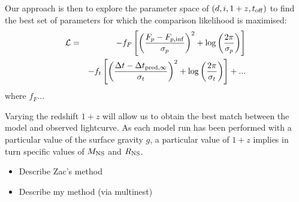 \documentclass{aastex61}
\begin{document}
Our approach is then to explore the parameter space of $(d, i, 1+z, t_{\rm off})$ to find the best set of parameters for which the comparison likelihood is maximised:
\begin{eqnarray}
\mathcal{L} & = & -f_F\left[\left( \frac{F_p-F_{p,\rm{inf}}}{\sigma_{p}}\right)^2 
    + \log\left(\frac{2\pi}{\sigma_p}\right)\right] \\
 & & -f_t\left[ \left( \frac{\Delta t-\Delta t_{{\rm pred},\infty}}{\sigma_t}\right)^2
    + \log\left(\frac{2\pi}{\sigma_t}\right)\right] + ...\\
\end{eqnarray}
where $f_F$...

Varying the redshift $1+z$ will allow us to obtain the best match between the model and observed lightcurve.
As each model run has been performed with a particular value of the surface gravity $g$, a particular value of $1+z$ implies in turn specific values of $M_{\rm NS}$ and $R_{\rm NS}$. 

\begin{itemize}
\item Describe Zac's method
\item Describe my method (via multinest)
\end{itemize}
\end{document}
